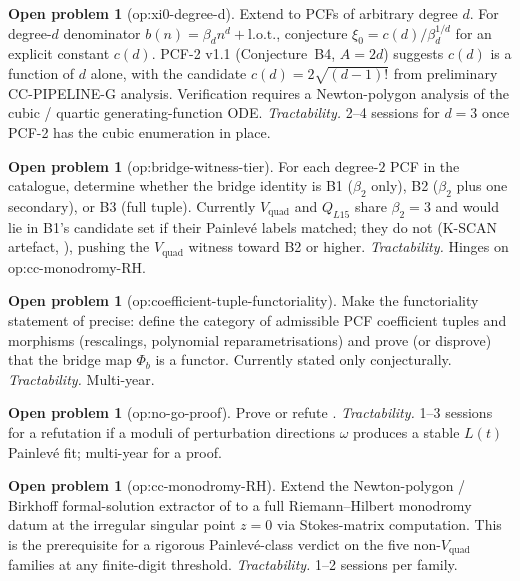 \documentclass[11pt,reqno]{amsart}
\theoremstyle{plain}
\theoremstyle{definition}
\newtheorem{problem}[theorem]{Open problem}
\theoremstyle{remark}
\newcommand{\Lt}{L(t)}
\newcommand{\Vquad}{V_{\mathrm{quad}}}
\begin{document}
\begin{problem}[\textsf{op:xi0-degree-d}]
Extend  to PCFs of arbitrary degree $d$. For
degree-$d$ denominator $b(n) = \beta_d n^d +
\mathrm{l.o.t.}$, conjecture $\xi_0 = c(d) / \beta_d^{1/d}$
for an explicit constant $c(d)$. PCF-2 v1.1
\cite{siarc_pcf2_v11} (Conjecture~B4, $A = 2d$) suggests
$c(d)$ is a function of $d$ alone, with the candidate
$c(d) = 2 \sqrt{(d-1)!}$ from preliminary CC-PIPELINE-G
analysis. Verification requires a Newton-polygon analysis
of the cubic / quartic generating-function ODE.
\emph{Tractability.} 2--4 sessions for $d=3$ once PCF-2 has
the cubic enumeration in place.
\end{problem}

\begin{problem}[\textsf{op:bridge-witness-tier}]
For each degree-$2$ PCF in the catalogue, determine whether
the bridge identity is B1 ($\beta_2$ only), B2 ($\beta_2$
plus one secondary), or B3 (full tuple). Currently $\Vquad$
and $Q_{L15}$ share $\beta_2 = 3$ and would lie in B1's
candidate set if their Painlev\'e labels matched; they do
not (K-SCAN artefact, ), pushing the
$\Vquad$ witness toward B2 or higher.
\emph{Tractability.} Hinges on \textsf{op:cc-monodromy-RH}.
\end{problem}

\begin{problem}[\textsf{op:coefficient-tuple-functoriality}]
Make the functoriality statement of 
precise: define the category of admissible PCF coefficient
tuples and morphisms (rescalings, polynomial
reparametrisations) and prove (or disprove) that the bridge
map $\Phi_b$ is a functor. Currently stated only
conjecturally.
\emph{Tractability.} Multi-year.
\end{problem}

\begin{problem}[\textsf{op:no-go-proof}]
Prove or refute .
\emph{Tractability.} 1--3 sessions for a refutation if a
moduli of perturbation directions $\omega$ produces a stable
$\Lt$ Painlev\'e fit; multi-year for a proof.
\end{problem}

\begin{problem}[\textsf{op:cc-monodromy-RH}]
Extend the Newton-polygon / Birkhoff formal-solution extractor
of \cite{siarc_cc_pipeline_g} to a full Riemann--Hilbert
monodromy datum at the irregular singular point $z=0$ via
Stokes-matrix computation. This is the prerequisite for a
rigorous Painlev\'e-class verdict on the five non-$\Vquad$
families at any finite-digit threshold.
\emph{Tractability.} 1--2 sessions per family.
\end{problem}
\end{document}
